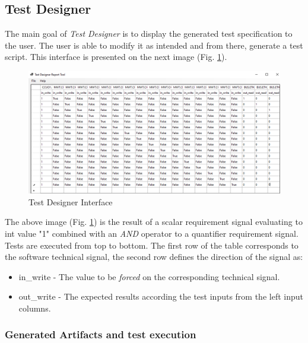 \subsection{Test Designer}
\label{subsec:test_designer}

The main goal of \textit{Test Designer} is to display the generated test specification to the user. The user is able to modify it as intended and from there, generate a test script. This interface is presented on the next image (Fig. \ref{fig:test_designer_interface}).

\begin{figure}[H]
    \centering
    \includegraphics[width=\textwidth]{images/test_designer.PNG}
    \caption{Test Designer Interface}
    \label{fig:test_designer_interface}
\end{figure}

The above image (Fig. \ref{fig:test_designer_interface}) is the result of a scalar requirement signal evaluating to int value "1" combined with an \textit{AND} operator to a quantifier requirement signal. Tests are executed from top to bottom.
The first row of the table corresponds to the software technical signal, the second row defines the direction of the signal as:

\begin{itemize}
    \item in\_write - The value to be \textit{forced} on the corresponding technical signal.
    \item out\_write - The expected results according the test inputs from the left input columns.
\end{itemize}


\subsubsection{Generated Artifacts and test execution}
\label{subsubsec:generated_artifacts}

